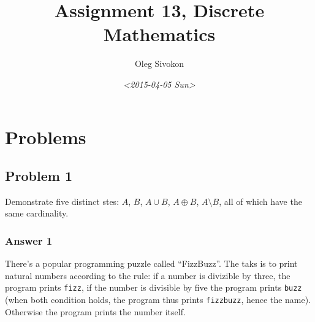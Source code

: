 \documentclass[11pt]{article}
\author{Oleg Sivokon}
\date{\textit{<2015-04-05 Sun>}}
\title{Assignment 13, Discrete Mathematics}
\begin{document}
\maketitle
\tableofcontents



\clearpage

\section{Problems}
\label{sec-1}

\subsection{Problem 1}
\label{sec-1-1}
Demonstrate five distinct stes: $A$, $B$, $A \cup B$, $A \oplus B$, $A \setminus B$,
all of which have the same cardinality.

\subsubsection{Answer 1}
\label{sec-1-1-1}
There's a popular programming puzzle called ``FizzBuzz''.  The taks is to
print natural numbers according to the rule: if a number is divizible by
three, the program prints \texttt{fizz}, if the number is divisible by five the
program prints \texttt{buzz} (when both condition holds, the program thus prints
\texttt{fizzbuzz}, hence the name).  Otherwise the program prints the number itself.
\end{document}
